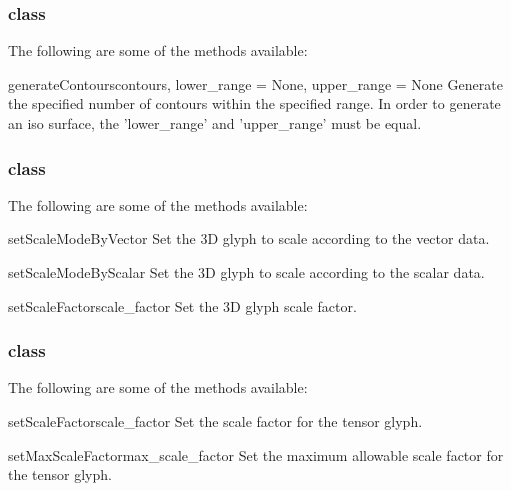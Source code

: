 \subsubsection{\ContourModule class}

The following are some of the methods available:

\begin{methoddesc}[ContourModule]{generateContours}{contours, 
lower_range = None, upper_range = None}
Generate the specified number of contours within the specified range.
In order to generate an iso surface, the 'lower_range' and 'upper_range' 
must be equal.
\end{methoddesc}

\subsubsection{\GlyphThreeD class}

The following are some of the methods available:

\begin{methoddesc}[Glyph3D]{setScaleModeByVector}{}
Set the 3D glyph to scale according to the vector data.
\end{methoddesc}

\begin{methoddesc}[Glyph3D]{setScaleModeByScalar}{}
Set the 3D glyph to scale according to the scalar data.
\end{methoddesc}

\begin{methoddesc}[Glyph3D]{setScaleFactor}{scale_factor}
Set the 3D glyph scale factor.
\end{methoddesc}

\subsubsection{\TensorGlyph class}

The following are some of the methods available:

\begin{methoddesc}[TensorGlyph]{setScaleFactor}{scale_factor}
Set the scale factor for the tensor glyph.
\end{methoddesc}

\begin{methoddesc}[TensorGlyph]{setMaxScaleFactor}{max_scale_factor}
Set the maximum allowable scale factor for the tensor glyph.
\end{methoddesc}

